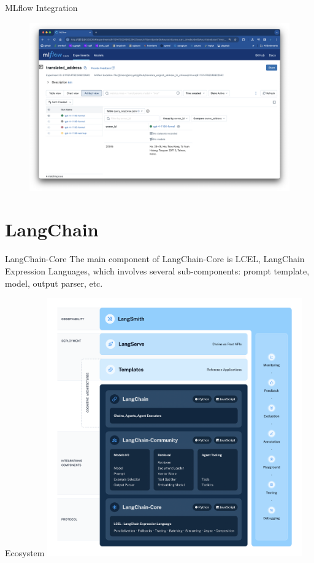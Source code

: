 \documentclass[11.5pt]{beamer}
\begin{document}
\begin{frame}{MLflow Integration}
\begin{figure}[H]
\centering
\includegraphics[width=11.5cm]{Figures/fig1.png}
\end{figure}
\end{frame}


\section{LangChain}
\begin{frame}{LangChain-Core}
The main component of LangChain-Core is LCEL, LangChain Expression Languages,
which involves several sub-components: prompt template, model, output parser,
etc.
\end{frame}

\begin{frame}{Ecosystem}
\includegraphics[width=11cm]{Figures/fig2.png}
\end{frame}
\end{document}

